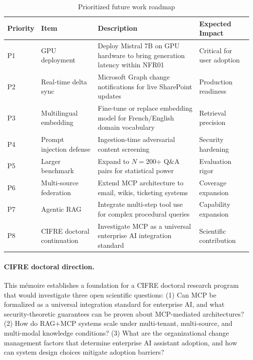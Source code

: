 \begin{table}[H]
\centering
\caption{Prioritized future work roadmap}
\label{tab:future-work}
\begin{tabularx}{\textwidth}{@{}llXl@{}}
\toprule
\textbf{Priority} & \textbf{Item} & \textbf{Description} & \textbf{Expected Impact} \\
\midrule
P1 & GPU deployment & Deploy Mistral 7B on GPU hardware to bring generation latency within NFR01 & Critical for user adoption \\
P2 & Real-time delta sync & Microsoft Graph change notifications for live SharePoint updates & Production readiness \\
P3 & Multilingual embedding & Fine-tune or replace embedding model for French/English domain vocabulary & Retrieval precision \\
P4 & Prompt injection defense & Ingestion-time adversarial content screening & Security hardening \\
P5 & Larger benchmark & Expand to $N=200$+ Q\&A pairs for statistical power & Evaluation rigor \\
P6 & Multi-source federation & Extend MCP architecture to email, wikis, ticketing systems & Coverage expansion \\
P7 & Agentic RAG & Integrate multi-step tool use for complex procedural queries & Capability expansion \\
P8 & CIFRE doctoral continuation & Investigate MCP as a universal enterprise AI integration standard & Scientific contribution \\
\bottomrule
\end{tabularx}
\end{table}

\paragraph{CIFRE doctoral direction.} This mémoire establishes a foundation for a CIFRE doctoral research program that would investigate three open scientific questions: (1) Can MCP be formalized as a universal integration standard for enterprise AI, and what security-theoretic guarantees can be proven about MCP-mediated architectures? (2) How do RAG+MCP systems scale under multi-tenant, multi-source, and multi-modal knowledge conditions? (3) What are the organizational change management factors that determine enterprise AI assistant adoption, and how can system design choices mitigate adoption barriers?

